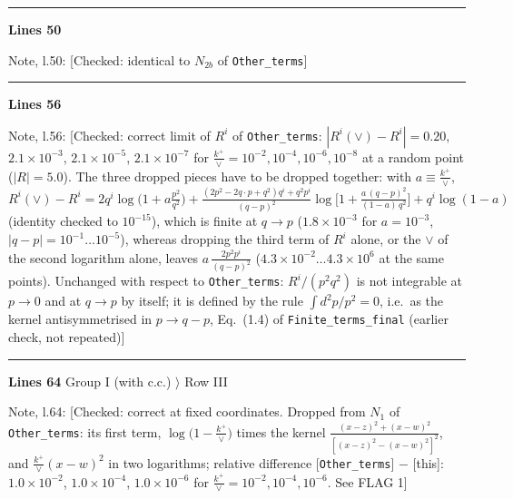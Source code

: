 \documentclass[10pt]{article}
\newenvironment{notebox}{\def\FrameCommand{{\color{notebar}\vrule width 1.5pt}\hspace{6pt}}\MakeFramed{\advance\hsize-\width\FrameRestore}\small}{\endMakeFramed}
\begin{document}
\noindent\rule{\linewidth}{0.3pt}\par\noindent\textbf{Lines 50}\par
\begin{notebox}\textsf{\small Note, l.50:} [Checked: identical to $N_{2b}$ of \texttt{Other\_terms}]\end{notebox}
\noindent\rule{\linewidth}{0.3pt}\par\noindent\textbf{Lines 56}\par
\begin{notebox}\textsf{\small Note, l.56:} [Checked: correct limit of $R^{i}$ of \texttt{Other\_terms}: $|R^{i}(\vee)-R^{i}|=0.20$, $2.1\times10^{-3}$, $2.1\times10^{-5}$, $2.1\times10^{-7}$ for $\frac{k^{+}}{\vee}=10^{-2},10^{-4},10^{-6},10^{-8}$ at a random point ($|R|=5.0$). The three dropped pieces have to be dropped together: with $a\equiv\frac{k^{+}}{\vee}$, $R^{i}(\vee)-R^{i}=2q^{i}\log\big(1+a\frac{p^{2}}{q^{2}}\big)+\frac{(2p^{2}-2q\cdot p+q^{2})q^{i}+q^{2}p^{i}}{(q-p)^{2}}\log\big[1+\frac{a\,(q-p)^{2}}{(1-a)\,q^{2}}\big]+q^{i}\log(1-a)$ (identity checked to $10^{-15}$), which is finite at $q\to p$ ($1.8\times10^{-3}$ for $a=10^{-3}$, $|q-p|=10^{-1}\dots10^{-5}$), whereas dropping the third term of $R^{i}$ alone, or the $\vee$ of the second logarithm alone, leaves $a\,\frac{2p^{2}p^{i}}{(q-p)^{2}}$ ($4.3\times10^{-2}\dots4.3\times10^{6}$ at the same points). Unchanged with respect to \texttt{Other\_terms}: $R^{i}/(p^{2}q^{2})$ is not integrable at $p\to0$ and at $q\to p$ by itself; it is defined by the rule $\int d^{2}p/p^{2}=0$, i.e.\ as the kernel antisymmetrised in $p\to q-p$, Eq.~(1.4) of \texttt{Finite\_terms\_final} (earlier check, not repeated)]\end{notebox}
\noindent\rule{\linewidth}{0.3pt}\par\noindent\textbf{Lines 64} \quad \textsf{Group I (with c.c.) $\rangle$ Row III}\par
\begin{notebox}\textsf{\small Note, l.64:} [Checked: correct at fixed coordinates. Dropped from $N_{1}$ of \texttt{Other\_terms}: its first term, $\log\big(1-\frac{k^{+}}{\vee}\big)$ times the kernel $\frac{(x-z)^{2}+(x-w)^{2}}{[(x-z)^{2}-(x-w)^{2}]^{2}}$, and $\frac{k^{+}}{\vee}(x-w)^{2}$ in two logarithms; relative difference [\texttt{Other\_terms}] $-$ [this]: $1.0\times10^{-2}$, $1.0\times10^{-4}$, $1.0\times10^{-6}$ for $\frac{k^{+}}{\vee}=10^{-2},10^{-4},10^{-6}$. See FLAG 1]\end{notebox}
\end{document}
